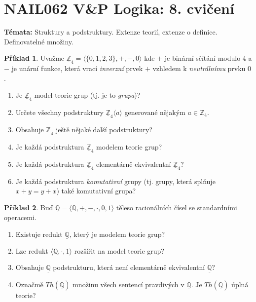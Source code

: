 \documentclass[a4paper]{article}
\theoremstyle{definition}
\newtheorem{problem}{Příklad}
\begin{document}
\section*{NAIL062 V\&P Logika: 8. cvičení}

\textbf{Témata:}
Struktury a podstruktury. Extenze teorií, extenze o definice. Definovatelné množiny.


\medskip\begin{problem}
    Uvažme $\underline{\mathbb{Z}}_4=\langle\{0,1,2,3\},+,-,0 \rangle$ kde $+$ je binární sčítání modulo $4$ a $-$ je unární funkce, která vrací \emph{inverzní} prvek $+$ vzhledem k \emph{neutrálnímu} prvku $0$.
    \begin{enumerate}        
        \item Je $\underline{\mathbb{Z}}_4$ model teorie grup (tj. je to \emph{grupa})?
        \item Určete všechny podstruktury $\underline{\mathbb{Z}}_4\langle a\rangle$ generované nějakým $a\in \mathbb{Z}_4$.
        \item Obsahuje $\underline{\mathbb{Z}}_4$ ještě nějaké další podstruktury?
        \item Je každá podstruktura $\underline{\mathbb{Z}}_4$ modelem teorie grup?
        \item Je každá podstruktura $\underline{\mathbb{Z}}_4$ elementárně ekvivalentní $\underline{\mathbb{Z}}_4$?
        \item Je každá podstruktura \emph{komutativní} grupy (tj. grupy, která splňuje $x+y=y+x$) také komutativní grupa?
    \end{enumerate}
\end{problem}
 
        
\medskip\begin{problem}
    Buď $\underline{\mathbb{Q}}=\langle\mathbb{Q},+,-,\cdot,0,1 \rangle$ těleso racionálních čísel se standardními operacemi.
    \begin{enumerate}                
        \item Existuje redukt $\underline{\mathbb{Q}}$, který je modelem teorie grup?
        \item Lze redukt $\langle\mathbb{Q},\cdot,1\rangle$ rozšířit na model teorie grup?
        \item Obsahuje $\underline{\mathbb{Q}}$ podstrukturu, která není elementárně ekvivalentní $\underline{\mathbb{Q}}$?
        \item Označmě $Th(\underline{\mathbb{Q}})$ množinu všech sentencí pravdivých v $\underline{\mathbb{Q}}$. Je $Th(\underline{\mathbb{Q}})$ úplná teorie?
    \end{enumerate}
\end{problem}
    
\end{document}
